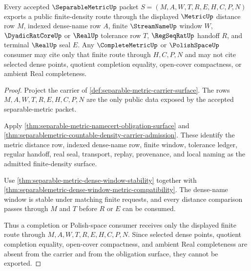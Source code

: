 \begin{theorem}
\label{thm:separable-metric-finite-density-public-export}
Every accepted $\SeparableMetricUp$ packet $S=(M,A,W,T,R,E,H,C,P,N)$ exports a public finite-density route through the displayed $\MetricUp$ distance row $M$, indexed dense-name row $A$, finite $\StreamNameUp$ window $W$, $\DyadicRatCoreUp$ or $\RealUp$ tolerance row $T$, $\RegSeqRatUp$ handoff $R$, and terminal $\RealUp$ seal $E$. Any $\CompleteMetricUp$ or $\PolishSpaceUp$ consumer may cite only that finite route through $H,C,P,N$ and may not cite selected dense points, quotient completion equality, open-cover compactness, or ambient Real completeness.
\end{theorem}
\begin{proof}
Project the carrier of \autoref{def:separable-metric-carrier-surface}. The rows $M,A,W,T,R,E,H,C,P,N$ are the only public data exposed by the accepted separable-metric packet.

Apply \autoref{thm:separable-metric-namecert-obligation-surface} and \autoref{thm:separablemetric-countable-density-carrier-admission}. These identify the metric distance row, indexed dense-name row, finite window, tolerance ledger, regular handoff, real seal, transport, replay, provenance, and local naming as the admitted finite-density surface.

Use \autoref{thm:separable-metric-dense-window-stability} together with \autoref{thm:separablemetric-dense-window-metric-compatibility}. The dense-name window is stable under matching finite requests, and every distance comparison passes through $M$ and $T$ before $R$ or $E$ can be consumed.

Thus a completion or Polish-space consumer receives only the displayed finite route through $M,A,W,T,R,E,H,C,P,N$. Since selected dense points, quotient completion equality, open-cover compactness, and ambient Real completeness are absent from the carrier and from the obligation surface, they cannot be exported.
\end{proof}

